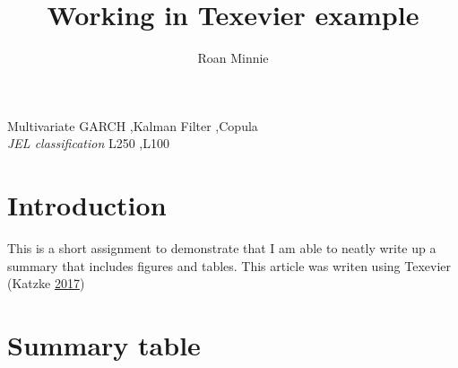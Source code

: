 \documentclass[11pt,preprint, authoryear]{elsarticle}
\numberwithin{equation}{section}
\numberwithin{figure}{section}
\numberwithin{table}{section}
\begin{document}
\begin{frontmatter}  %

\title{Working in Texevier example}





\author[Add1]{Roan Minnie}





\address[Add1]{Stellenbosch University, Stellenbosch, South Africa}



\vspace{1cm}

\begin{keyword}
\footnotesize{
Multivariate GARCH \sep Kalman Filter \sep Copula \\ \vspace{0.3cm}
\textit{JEL classification} L250 \sep L100
}
\end{keyword}
\vspace{0.5cm}
\end{frontmatter}



\pagestyle{fancy}
\chead{}
\rhead{}
\lfoot{}
\lhead{}
\cfoot{}


\headsep 35pt %




\section{\texorpdfstring{Introduction
\label{Introduction}}{Introduction }}\label{introduction}

This is a short assignment to demonstrate that I am able to neatly write
up a summary that includes figures and tables. This article was writen
using Texevier (Katzke \protect\hyperlink{ref-Texevier}{2017})

\section{\texorpdfstring{Summary table
\label{summary}}{Summary table }}\label{summary-table}
\end{document}

